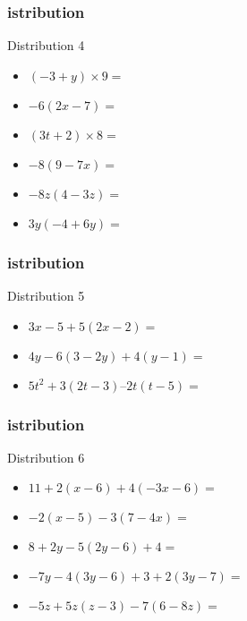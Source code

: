 \documentclass{beamer}
\begin{document}
\begin{frame}
  \frametitle{istribution}
  \begin{exampleblock}{Distribution 4}
    \begin{itemize}
    \item<1-> $ (- 3 + y) \times 9        = $
    \item<2-> $ -6 (2x - 7)               = $
    \item<3-> $ (3t + 2) \times 8         = $
    \item<4-> $ -8 (9 - 7x)               = $
    \item<5-> $ -8z (4 - 3z)              = $
    \item<6-> $ 3y (- 4 + 6y)             = $
    \end{itemize}
  \end{exampleblock}
\end{frame}

\begin{frame}
  \frametitle{istribution}
  \begin{exampleblock}{Distribution 5}
    \begin{itemize}
    \item $ 3x - 5 + 5(2x - 2)                   = $
    \item $ 4y - 6(3 - 2y) + 4(y - 1)            = $
    \item $ 5t^2 + 3(2t - 3) – 2t(t - 5)         = $
    \end{itemize}
  \end{exampleblock}
\end{frame}

\begin{frame}
  \frametitle{istribution}
  \begin{exampleblock}{Distribution 6}
    \begin{itemize}
    \item $ 11 + 2(x - 6) + 4(- 3x - 6)        = $
    \item $ -2(x - 5) - 3(7 - 4x)              = $
    \item $ 8 + 2y - 5(2y - 6) + 4             = $
    \item $ -7y - 4(3y - 6) + 3 + 2(3y - 7)    = $   
    \item $ -5z + 5z(z - 3) - 7(6 - 8z)        = $    
    \end{itemize}
  \end{exampleblock}
\end{frame}
\end{document}
